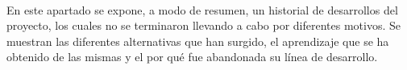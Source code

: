 \paragraph{}
En este apartado se expone, a modo de resumen, un historial de desarrollos del proyecto, los cuales no se terminaron llevando a cabo por diferentes motivos. 
Se muestran las diferentes alternativas que han surgido, el aprendizaje que se ha obtenido de las mismas y el por qué fue abandonada su línea de desarrollo.
